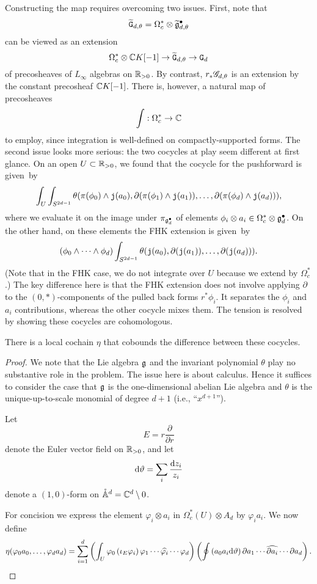 Constructing the map requires overcoming two issues.
First, note that 
\[
\widetilde{\mathtt{G}}_{d,\theta} = \Omega^*_c \otimes \widetilde{\mathfrak g}^\bullet_{d,\theta}
\]
can be viewed as an extension
\[
\Omega^*_c \otimes \mathbb C K[-1] \to \widetilde{\mathtt{G}}_{d,\theta} \to \mathtt{G}_d
\]
of precosheaves of $L_\infty$ algebras on $\mathbb R_{>0}$.
By contrast, $r_* \mathscr G_{d,\theta}$ is an extension by the constant precosheaf $\mathbb C K[-1]$.
There is, however, a natural map of precosheaves
\[
\int: \Omega^*_c \to \mathbb C
\]
to employ, since integration is well-defined on compactly-supported forms.
The second issue looks more serious:
the two cocycles at play seem different at first glance.
On an open $U \subset \mathbb R_{>0}$, 
we found that the cocycle for the pushforward is given~by
\[
\int_U \int_{S^{2d-1}} \theta(\pi(\phi_0) \wedge {\mathtt{j}}(a_0),\partial (\pi(\phi_1) \wedge {\mathtt{j}}(a_1)),\ldots,\partial(\pi(\phi_d) \wedge {\mathtt{j}}(a_d))),
\]
where we evaluate it on the image under $\pi_{\mathfrak g^\bullet_d}$ of elements $\phi_i \otimes a_i \in \Omega^*_c \otimes \mathfrak g^\bullet_d$.
On the other hand, on these elements the FHK extension is given~by
\[
(\phi_0 \wedge \cdots \wedge \phi_d) \int_{S^{2d-1}} \theta({\mathtt{j}}(a_0),\partial ({\mathtt{j}}(a_1)),\ldots,\partial({\mathtt{j}}(a_d))).
\]
(Note that in the FHK case, we do not integrate over $U$ because we extend by $\Omega^*_c$.)
The key difference here is that the FHK extension does not involve applying $\partial$ to the $(0,*)$-components of the pulled back forms $r^* \phi_i$.
It separates the $\phi_i$ and $a_i$ contributions,
whereas the other cocycle mixes them.
The tension is resolved by showing these cocycles are cohomologous.

\begin{lem}
There is a local cochain $\eta$ that cobounds the difference between these cocycles.
\end{lem}

\begin{proof}
We note that the Lie algebra $\mathfrak g$ and the invariant polynomial $\theta$ play no substantive role in the problem.
The issue here is about calculus.
Hence it suffices to consider the case that $\mathfrak g$ is the one-dimensional abelian Lie algebra and $\theta$ is the unique-up-to-scale monomial of degree $d+1$ (i.e., ``$x^{d+1}$'').

Let
\[
E = r \frac{\partial}{\partial r}
\]
denote the Euler vector field on $\mathbb R_{>0}$,
and let
\[
{\rm d} \vartheta = \sum_i \frac{{\rm d} z_i}{z_i} 
\]
denote a $(1,0)$-form on $\mathring{\mathbb A}^d = \mathbb C^{d} \setminus 0$. 

For concision we express the element $\varphi_i \otimes a_i $ in $\Omega^*_c(U) \otimes A_d $ by $\varphi_i a_i$.
We now define
\[
\eta(\varphi_0 a_0,\ldots,\varphi_da_d) = \sum_{i=1}^d \left(\int_U \varphi_0 \left(\iota_{E} \varphi_i \right) \varphi_1 \cdots \widehat{\varphi_i} \cdots \varphi_d\right)\left(\oint \left(a_0 a_i {\rm d} \vartheta\right) \partial a_1 \cdots \widehat{\partial a_i} \cdots \partial a_d \right)  .
\]
\end{proof}

